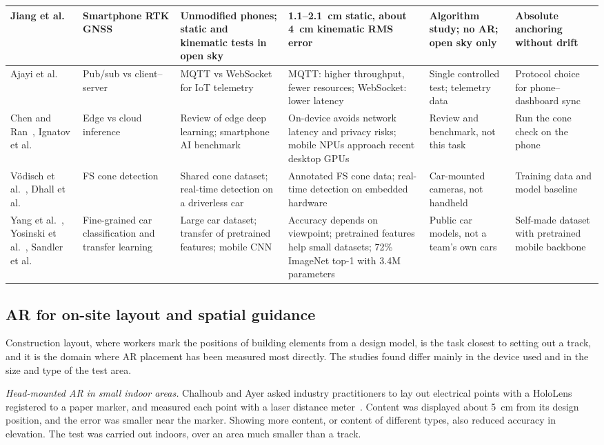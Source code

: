 \begin{table}[!t]
\begin{tabular}{|L{0.11\textwidth}|L{0.11\textwidth}|L{0.18\textwidth}|L{0.18\textwidth}|L{0.17\textwidth}|L{0.15\textwidth}|}
Jiang et al.~\cite{jiang2023} & Smartphone RTK GNSS & Unmodified phones; static and kinematic tests in open sky & 1.1--2.1~cm static, about 4~cm kinematic RMS error & Algorithm study; no AR; open sky only & Absolute anchoring without drift \\ \hline
Ajayi et al.~\cite{ajayi2023} & Pub/sub vs client--server & MQTT vs WebSocket for IoT telemetry & MQTT: higher throughput, fewer resources; WebSocket: lower latency & Single controlled test; telemetry data & Protocol choice for phone--dashboard sync \\ \hline
Chen and Ran~\cite{chen2019}, Ignatov et al.~\cite{ignatov2019} & Edge vs cloud inference & Review of edge deep learning; smartphone AI benchmark & On-device avoids network latency and privacy risks; mobile NPUs approach recent desktop GPUs & Review and benchmark, not this task & Run the cone check on the phone \\ \hline
V\"odisch et al.~\cite{vodisch2022}, Dhall et al.~\cite{dhall2019} & FS cone detection & Shared cone dataset; real-time detection on a driverless car & Annotated FS cone data; real-time detection on embedded hardware & Car-mounted cameras, not handheld & Training data and model baseline \\ \hline
Yang et al.~\cite{yang2015}, Yosinski et al.~\cite{yosinski2014}, Sandler et al.~\cite{sandler2018} & Fine-grained car classification and transfer learning & Large car dataset; transfer of pretrained features; mobile CNN & Accuracy depends on viewpoint; pretrained features help small datasets; 72\% ImageNet top-1 with 3.4M parameters & Public car models, not a team's own cars & Self-made dataset with pretrained mobile backbone \\ \hline
\end{tabular}
\end{table}

\subsection{AR for on-site layout and spatial guidance}
Construction layout, where workers mark the positions of building elements from a design model, is the task closest to setting out a track, and it is the domain where AR placement has been measured most directly. The studies found differ mainly in the device used and in the size and type of the test area.

\textit{Head-mounted AR in small indoor areas.} Chalhoub and Ayer asked industry practitioners to lay out electrical points with a HoloLens registered to a paper marker, and measured each point with a laser distance meter~\cite{chalhoub2019}. Content was displayed about 5~cm from its design position, and the error was smaller near the marker. Showing more content, or content of different types, also reduced accuracy in elevation. The test was carried out indoors, over an area much smaller than a track.

